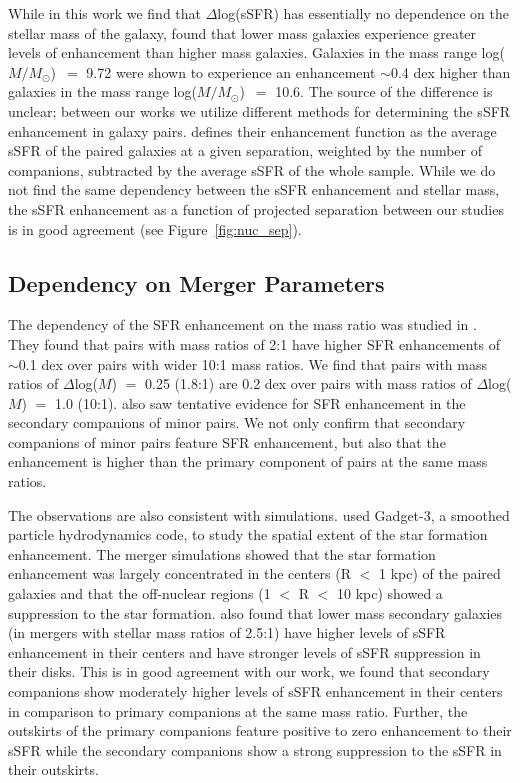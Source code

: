\documentclass[iop,revtex4,twocolumn,apj,numberedappendix,appendixfloats]{emulateapj}
\newcommand{\logm}{log($M/M_{\odot}$)}
\begin{document}
While in this work we find that $\Delta$log(sSFR) has essentially no dependence on the stellar mass of the galaxy, \citet{Li:2008} found that lower mass galaxies experience greater levels of enhancement than higher mass galaxies. Galaxies in the mass range \logm\ $=$ 9.72 were shown to experience an enhancement $\sim$0.4 dex higher than galaxies in the mass range \logm\ $=$ 10.6. The source of the difference is unclear; between our works we utilize different methods for determining the sSFR enhancement in galaxy pairs. \citet{Li:2008} defines their enhancement function as the average sSFR of the paired galaxies at a given separation, weighted by the number of companions, subtracted by the average sSFR of the whole sample. While we do not find the same dependency between the sSFR enhancement and stellar mass, the sSFR enhancement as a function of projected separation between our studies is in good agreement (see Figure~\ref{fig:nuc_sep}).

\subsection{Dependency on Merger Parameters}

The dependency of the SFR enhancement on the mass ratio was studied in \citet{Ellison:2008}. They found that pairs with mass ratios of 2:1 have higher SFR enhancements of $\sim$0.1 dex over pairs with wider 10:1 mass ratios. We find that pairs with mass ratios of $\Delta$log($M$) $=$ 0.25 (1.8:1) are 0.2 dex over pairs with mass ratios of $\Delta$log($M$) $=$ 1.0 (10:1). \citet{Ellison:2008} also saw tentative evidence for SFR enhancement in the secondary companions of minor pairs. We not only confirm that secondary companions of minor pairs feature SFR enhancement, but also that the enhancement is higher than the primary component of pairs at the same mass ratios. 

The observations are also consistent with simulations. \citet{Moreno:2015} used {\sc Gadget}-3, a smoothed particle hydrodynamics code, to study the spatial extent of the star formation enhancement. The merger simulations showed that the star formation enhancement was largely concentrated in the centers (R $<$ 1 kpc) of the paired galaxies and that the off-nuclear regions (1 $<$ R $<$ 10 kpc) showed a suppression to the star formation. \citet{Moreno:2015} also found that lower mass secondary galaxies (in mergers with stellar mass ratios of 2.5:1) have higher levels of sSFR enhancement in their centers and have stronger levels of sSFR suppression in their disks. This is in good agreement with our work, we found that secondary companions show moderately higher levels of sSFR enhancement in their centers in comparison to primary companions at the same mass ratio. Further, the outskirts of the primary companions feature positive to zero enhancement to their sSFR while the secondary companions show a strong suppression to the sSFR in their outskirts. 
\end{document}
